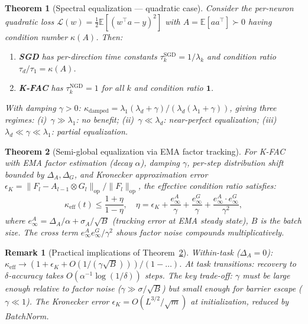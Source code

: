 \documentclass{article}
\newtheorem{theorem}{Theorem}
\newtheorem{remark}{Remark}
\newcommand{\EE}{\mathbb{E}}
\newcommand{\cL}{\mathcal{L}}
\begin{document}
\begin{theorem}[Spectral equalization --- quadratic case]
\label{thm:spectral}
Consider the per-neuron quadratic loss $\cL(w) = \frac{1}{2}\EE[(w^\top a - y)^2]$ with $A = \EE[aa^\top] \succ 0$ having condition number $\kappa(A)$. Then:
\begin{enumerate}[nosep]
    \item[(a)] \textbf{SGD} has per-direction time constants $\tau_k^{\mathrm{SGD}} = 1/\lambda_k$ and condition ratio $\tau_d/\tau_1 = \kappa(A)$.
    \item[(b)] \textbf{K-FAC} has $\tau_k^{\mathrm{NGD}} = 1$ for all $k$ and condition ratio $\bm{1}$.
\end{enumerate}
With damping $\gamma > 0$: $\kappa_{\mathrm{damped}} = \lambda_1(\lambda_d + \gamma)/(\lambda_d(\lambda_1 + \gamma))$, giving three regimes: (i)~$\gamma \gg \lambda_1$: no benefit; (ii)~$\gamma \ll \lambda_d$: near-perfect equalization; (iii)~$\lambda_d \ll \gamma \ll \lambda_1$: partial equalization.
\end{theorem}

\begin{theorem}[Semi-global equalization via EMA factor tracking]
\label{thm:tracking}
For K-FAC with EMA factor estimation (decay $\alpha$), damping $\gamma$, per-step distribution shift bounded by $\Delta_A, \Delta_G$, and Kronecker approximation error $\epsilon_K = \|F_l - A_{l-1}\otimes G_l\|_{\mathrm{op}}/\|F_l\|_{\mathrm{op}}$, the effective condition ratio satisfies:
\[
\kappa_{\mathrm{eff}}(t) \leq \frac{1+\eta}{1-\eta}, \quad \eta = \epsilon_K + \frac{e_\infty^A}{\gamma} + \frac{e_\infty^G}{\gamma} + \frac{e_\infty^A \cdot e_\infty^G}{\gamma^2},
\]
where $e_\infty^A = \Delta_A/\alpha + \sigma_A/\sqrt{B}$ (tracking error at EMA steady state), $B$ is the batch size. The cross term $e_\infty^A e_\infty^G/\gamma^2$ shows factor noise compounds multiplicatively.
\end{theorem}

\begin{remark}[Practical implications of Theorem~\ref{thm:tracking}]
\emph{Within-task} ($\Delta_A = 0$): $\kappa_{\mathrm{eff}} \to (1 + \epsilon_K + O(1/(\gamma\sqrt{B})))/(1 - \ldots)$. \emph{At task transitions}: recovery to $\delta$-accuracy takes $O(\alpha^{-1}\log(1/\delta))$ steps. The key trade-off: $\gamma$ must be large enough relative to factor noise ($\gamma \gg \sigma/\sqrt{B}$) but small enough for barrier escape ($\gamma \ll 1$). The Kronecker error $\epsilon_K = O(L^{3/2}/\sqrt{m})$ at initialization, reduced by BatchNorm.
\end{remark}
\end{document}
